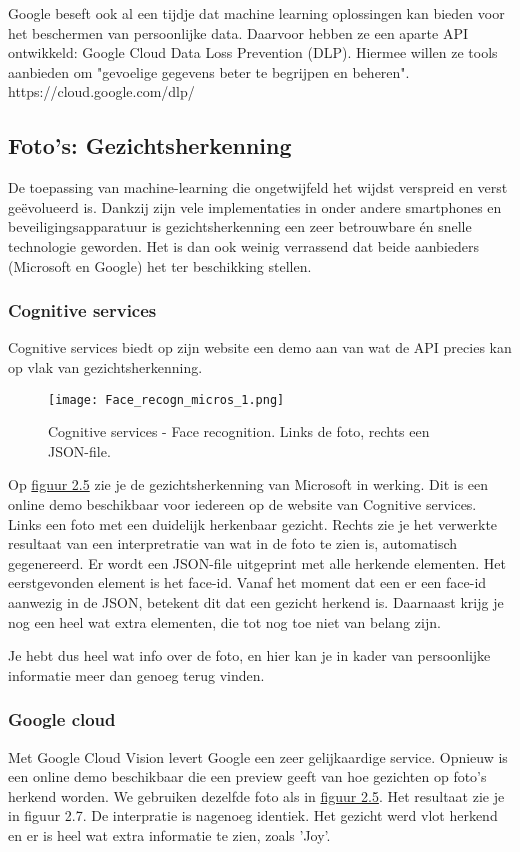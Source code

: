 Google beseft ook al een tijdje dat machine learning oplossingen kan bieden voor het beschermen van persoonlijke data. Daarvoor hebben ze een aparte API ontwikkeld: Google Cloud Data Loss Prevention (DLP). Hiermee willen ze tools aanbieden om "gevoelige gegevens beter te begrijpen en beheren". 
https://cloud.google.com/dlp/

\subsection{Foto's: Gezichtsherkenning}
De toepassing van machine-learning die ongetwijfeld het wijdst verspreid en verst geëvolueerd is. Dankzij zijn vele implementaties in onder andere smartphones en beveiligingsapparatuur is gezichtsherkenning een zeer betrouwbare én snelle technologie geworden. Het is dan ook weinig verrassend dat beide aanbieders (Microsoft en Google) het ter beschikking stellen. 

\subsubsection{Cognitive services}
Cognitive services biedt op zijn website een demo aan van wat de API precies kan op vlak van gezichtsherkenning.   


\begin{figure}[h]
    \texttt{[image: Face\_recogn\_micros\_1.png]}
    \caption{Cognitive services - Face recognition. Links de foto, rechts een JSON-file.}
    \label{fig:cognitive}
\end{figure}

Op \hyperref[fig:cognitive]{figuur 2.5} zie je de gezichtsherkenning van Microsoft in werking. Dit is een online demo beschikbaar voor iedereen op de website van Cognitive services. Links een foto met een duidelijk herkenbaar gezicht. Rechts zie je het verwerkte resultaat van een interpretratie van wat in de foto te zien is, automatisch gegenereerd. Er wordt een JSON-file uitgeprint met alle herkende elementen. Het eerstgevonden element is het face-id. Vanaf het moment dat een er een face-id aanwezig in de JSON, betekent dit dat een gezicht herkend is. Daarnaast krijg je nog een heel wat extra elementen, die tot nog toe niet van belang zijn. 

Je hebt dus heel wat info over de foto, en hier kan je in kader van persoonlijke informatie meer dan genoeg terug vinden. 

\subsubsection{Google cloud}
Met Google Cloud Vision levert Google een zeer gelijkaardige service. Opnieuw is een online demo beschikbaar die een preview geeft van hoe gezichten op foto's herkend worden. We gebruiken dezelfde foto als in \hyperref[fig:cognitive2]{figuur 2.5}. Het resultaat zie je in figuur 2.7. De interpratie is nagenoeg identiek. Het gezicht werd vlot herkend en er is heel wat extra informatie te zien, zoals 'Joy'. 

